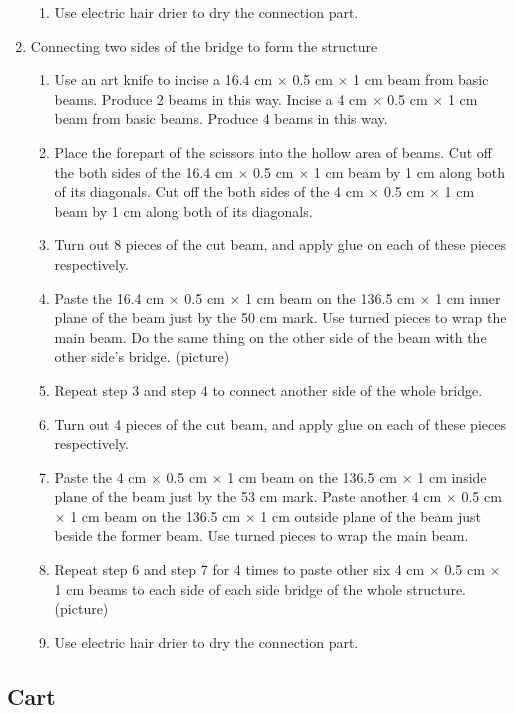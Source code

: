 \begin{enumerate}
\begin{enumerate}
	\item Use electric hair drier to dry the connection part.
	\end{enumerate}
\item Connecting two sides of the bridge to form the structure
	\begin{enumerate}
	\item Use an art knife to incise a 16.4 cm $\times$ 0.5 cm $\times$ 1 cm beam from basic beams. Produce 2 beams in this way. Incise a 4 cm $\times$ 0.5 cm $\times$ 1 cm beam from basic beams. Produce 4 beams in this way.
	\item Place the forepart of the scissors into the hollow area of beams. Cut off the both sides of the 16.4 cm $\times$ 0.5 cm $\times$ 1 cm beam by 1 cm along both of its diagonals. Cut off the both sides of the 4 cm $\times$ 0.5 cm $\times$ 1 cm beam by 1 cm along both of its diagonals.
	\item Turn out 8 pieces of the cut beam, and apply glue on each of these pieces respectively. 
	\item Paste the 16.4 cm $\times$ 0.5 cm $\times$ 1 cm beam on the 136.5 cm  $\times$ 1 cm inner plane of the beam just by the 50 cm mark. Use turned pieces to wrap the main beam. Do the same thing on the other side of the beam with the other side’s bridge.
	(picture) 
	\item Repeat step 3 and step 4 to connect another side of the whole bridge.
	\item Turn out 4 pieces of the cut beam, and apply glue on each of these pieces respectively. 
	\item Paste the 4 cm $\times$ 0.5 cm $\times$ 1 cm beam on the 136.5 cm  $\times$ 1 cm inside plane of the beam just by the 53 cm mark. Paste another 4 cm $\times$ 0.5 cm $\times$ 1 cm beam on the 136.5 cm  $\times$ 1 cm outside plane of the beam just beside the former beam. Use turned pieces to wrap the main beam. 
	\item Repeat step 6 and step 7 for 4 times to paste other six 4 cm $\times$ 0.5 cm $\times$ 1 cm beams to each side of each side bridge of the whole structure. 
	(picture)
	\item Use electric hair drier to dry the connection part. 
	\end{enumerate}
\end{enumerate}




\subsection{Cart}